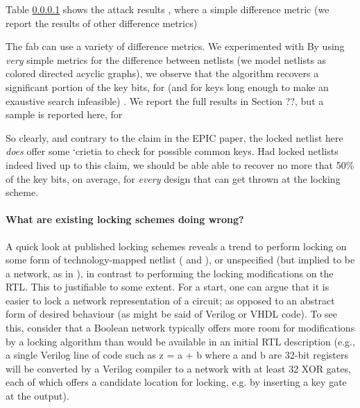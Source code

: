 Table \ref{} shows the attack results , where a simple difference metric (we report the results of other difference metrics)

The fab can use a variety of difference metrics. We experimented with  By using \emph{very} simple metrics for the difference between netlists (we model netlists as colored directed acyclic graphs), we observe that the algorithm recovers a significant portion of the key bits, for (and for keys long enough to make an exaustive search infeasible) . We report the full results in Section ??, but a sample is reported here, for  


So clearly, and contrary to the claim in the EPIC paper, the locked netlist here \emph{does} offer some `crietia to check for possible common keys. Had locked netlists indeed lived up to this claim, we should be able able to recover no more that 50\% of the key bits, on average, for \emph{every} design that can get thrown at the locking scheme.


\paragraph{What are existing locking schemes doing wrong?} A quick look at published locking schemes reveals a trend to perform locking on some form of technology-mapped netlist (\cite{} and \cite{}), or unspecified (but implied to be a network, as in \cite{}), in contrast to performing the locking modifications on the RTL. This to justifiable to some extent. For a start, one can argue that it is easier to lock a network representation of a circuit; as opposed to an abstract form of desired behaviour (as might be said of Verilog or VHDL code). To see this, consider that a Boolean network typically offers more room for modifications by a locking algorithm than would be available in an initial RTL description (e.g., a single Verilog line of code such as z = a + b where a and b are 32-bit registers will be converted by a Verilog compiler to a network with at least 32 XOR gates, each of which offers a candidate location for locking, e.g. by inserting a key gate at the output). 

